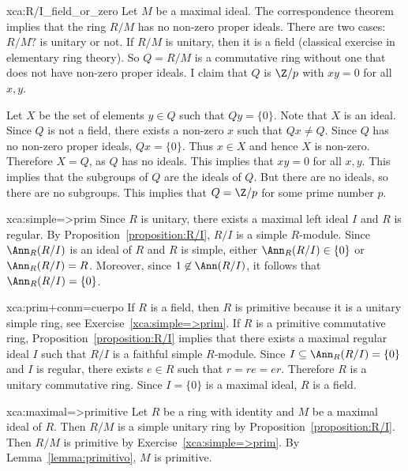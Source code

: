 \begin{sol}{xca:R/I_field_or_zero}
Let $M$ be a maximal ideal. The correspondence theorem implies that the ring $R/M$ has no non-zero proper ideals. There are two cases: $R/M?$ is unitary or not. If $R/M$ is unitary, then it is a field (classical exercise in elementary ring theory). So $Q=R/M$ is a commutative ring without one that does not have non-zero proper ideals. I claim that $Q$ is $\Z/p$ with $xy=0$ for all $x,y$. 

Let $X$ be the set of elements $y\in Q$ such that $Qy=\{0\}$. Note that $X$ is an ideal. Since $Q$ is not a field, there exists a non-zero $x$ such that $Qx\ne Q$. Since $Q$ has no non-zero proper ideals, $Qx=\{0\}$. Thus $x\in X$ and hence $X$ is non-zero. Therefore $X=Q$, as $Q$ has no ideals. This implies that $xy=0$ for all $x,y$. This implies that the subgroups of $Q$ are the ideals of $Q$. But there are no ideals, so there are no subgroups. This implies that $Q =\Z/p$ for some prime number $p$.  
\end{sol}

\begin{sol}{xca:simple=>prim} 
	Since $R$ is unitary, there exists a maximal left ideal $I$ and $R$ is regular.
	By Proposition~\ref{proposition:R/I}, $R/I$ is a simple $R$-module. 
	Since $\Ann_R(R/I)$ is an ideal of $R$ and $R$ is simple, either $\Ann_R(R/I)\in\{0\}$ or 
	$\Ann_R(R/I)=R$. Moreover, since 
	$1\not\in\Ann(R/I)$, it follows that 
	$\Ann_R(R/I)=\{0\}$. 
\end{sol}

\begin{sol}{xca:prim+conm=cuerpo}
	If $R$ is a field, then $R$ is primitive because it is a unitary simple ring, see  
	Exercise~\ref{xca:simple=>prim}. If $R$ is a primitive commutative ring, Proposition~\ref{proposition:R/I} implies that there exists a maximal regular ideal $I$
	such that  
	$R/I$ is a faithful simple $R$-module. 
	Since $I\subseteq \Ann_R(R/I)=\{0\}$ and $I$ is regular, there exists $e\in R$ such that 
	$r=re=er$. Therefore $R$ is a unitary commutative ring. Since $I=\{0\}$ is a maximal ideal, 
	$R$ is a field. 
\end{sol}

\begin{sol}{xca:maximal=>primitive}
	Let $R$ be a ring with identity and $M$ be a maximal ideal of $R$. Then 
	$R/M$ is a simple unitary ring by 
	Proposition~\ref{proposition:R/I}. Then $R/M$ is primitive by
	Exercise~\ref{xca:simple=>prim}. By Lemma~\ref{lemma:primitivo}, 
	$M$ is primitive. 
\end{sol}




